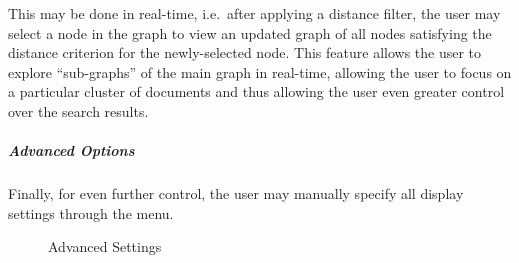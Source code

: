 This may be done in real-time, i.e.\ after applying a distance filter, the user may select a node in the graph to view an updated graph of all nodes satisfying the distance criterion for the newly-selected node. This feature allows the user to explore ``sub-graphs'' of the main graph in real-time, allowing the user to focus on a particular cluster of documents and thus allowing the user even greater control over the search results.

\subparagraph{Advanced Options}
Finally, for even further control, the user may manually specify all display settings through the  menu.

\begin{figure}[ht]
\centering
\caption{Advanced Settings}
\quad
{}\quad
{}
\end{figure}

